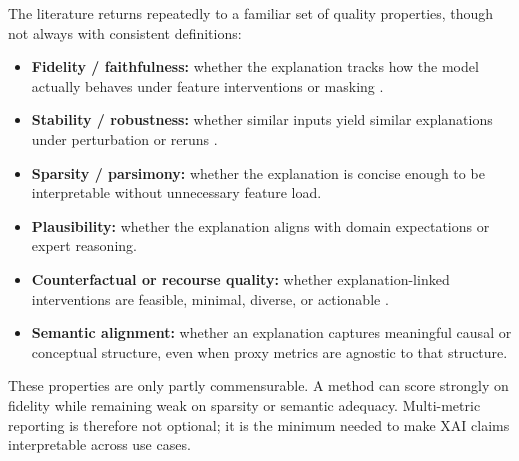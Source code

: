 \documentclass[10pt,a4paper,twoside]{article}
\begin{document}
The literature returns repeatedly to a familiar set of quality properties,
though not always with consistent definitions:
\begin{itemize}[leftmargin=*]
\item \textbf{Fidelity / faithfulness:} whether the explanation tracks
how the model actually behaves under feature interventions or masking
\citep{ribeiro2016why,lundberg2017unified,zheng2025ffidelity}.
\item \textbf{Stability / robustness:} whether similar inputs yield
similar explanations under perturbation or reruns
\citep{pawlicki2024metrics,canha2025benchmark}.
\item \textbf{Sparsity / parsimony:} whether the explanation is concise
enough to be interpretable without unnecessary feature load.
\item \textbf{Plausibility:} whether the explanation aligns with domain
expectations or expert reasoning.
\item \textbf{Counterfactual or recourse quality:} whether
explanation-linked interventions are feasible, minimal, diverse, or
actionable \citep{mothilal2020dice}.
\item \textbf{Semantic alignment:} whether an explanation captures
meaningful causal or conceptual structure, even when proxy metrics are
agnostic to that structure.
\end{itemize}

These properties are only partly commensurable. A method can score
strongly on fidelity while remaining weak on sparsity or semantic
adequacy. Multi-metric reporting is therefore not optional; it is the
minimum needed to make XAI claims interpretable across use cases.
\end{document}
